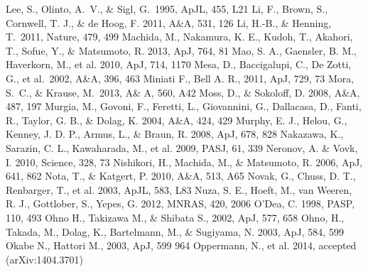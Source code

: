\begin{thebibliography}{99}
\begin{multicols}{2}
{
	Lee, S., Olinto, A.~V., \& Sigl, G.\ 1995, ApJL, 455, L21 
	Li, F., Brown, S., Cornwell, T. J., \& de Hoog, F. 2011, A\&A, 531, 126
	Li, H.-B., \& Henning, T.\ 2011, Nature, 479, 499 
	Machida, M., Nakamura, K. E., Kudoh, T., Akahori, T., Sofue, Y., \& Matsumoto, R. 2013, ApJ, 764, 81
	Mao, S. A., Gaensler, B. M., Haverkorn, M., et al. 2010, ApJ, 714, 1170
	Mesa, D., Baccigalupi, C., De Zotti, G., et al.\ 2002, A\&A, 396, 463 
    Miniati F., Bell A. R., 2011, ApJ, 729, 73
	Mora, S.~C., \& Krause, M.\ 2013, A\& A, 560, A42 
	Moss, D., \& Sokoloff, D. 2008, A\&A, 487, 197
	Murgia, M., Govoni, F., Feretti, L., Giovannini, G., Dallacasa, D., Fanti, R., Taylor, G. B., \& Dolag, K. 2004, A\&A, 424, 429
	Murphy, E. J., Helou, G., Kenney, J. D. P., Armus, L., \& Braun, R. 2008, ApJ, 678, 828
	Nakazawa, K., Sarazin, C. L., Kawaharada, M., et al. 2009, PASJ, 61, 339
	Neronov, A. \& Vovk, I. 2010, Science, 328, 73
	Nishikori, H., Machida, M., \& Matsumoto, R. 2006, ApJ, 641, 862
	Nota, T., \& Katgert, P. 2010, A\&A, 513, A65
	Novak, G., Chuss, D. T., Renbarger, T., et al. 2003, ApJL, 583, L83
	Nuza, S. E., Hoeft, M., van Weeren, R. J., Gottl\:ober, S., Yepes, G. 2012, MNRAS, 420, 2006
	O'Dea, C. 1998, PASP, 110, 493
	Ohno H., Takizawa M., \& Shibata S., 2002, ApJ, 577, 658
	Ohno, H., Takada, M., Dolag, K., Bartelmann, M., \& Sugiyama, N. 2003, ApJ, 584, 599
	Okabe N., Hattori M., 2003, ApJ, 599 964
	Oppermann, N., et al. 2014, accepted (arXiv:1404.3701)
}
\end{multicols}
\end{thebibliography}
